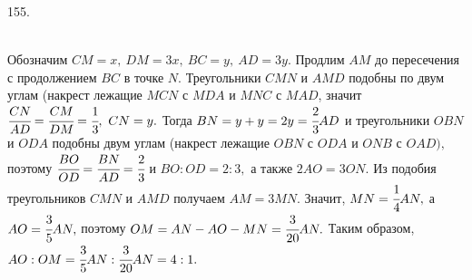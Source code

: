 155. \begin{figure}[ht!]
\end{figure}\\
Обозначим $CM=x,\ DM=3x,\ BC=y,\ AD=3y.$ Продлим $AM$ до пересечения с продолжением $BC$ в точке $N.$ Треугольники $CMN$ и $AMD$ подобны по двум углам (накрест лежащие  $MCN$ с $MDA$ и $MNC$ с $MAD$, значит $\cfrac{CN}{AD}=\cfrac{CM}{DM}=\cfrac{1}{3},\ CN=y.$ Тогда $BN=y+y=2y=\cfrac{2}{3}AD$ и треугольники $OBN$ и $ODA$ подобны двум углам (накрест лежащие $OBN$ с $ODA$ и $ONB$ с $OAD),$ поэтому $\cfrac{BO}{OD}=\cfrac{BN}{AD}=\cfrac{2}{3}$ и $BO:OD=2:3,$ а также $2AO=3ON.$ Из подобия треугольников $CMN$ и $AMD$ получаем $AM=3MN.$ Значит, $MN=\cfrac{1}{4}AN,$ а $AO=\cfrac{3}{5}AN,$ поэтому $OM=AN-AO-MN=\cfrac{3}{20}AN.$ Таким образом, $AO:OM=\cfrac{3}{5}AN:\cfrac{3}{20}AN=4:1.$\\
